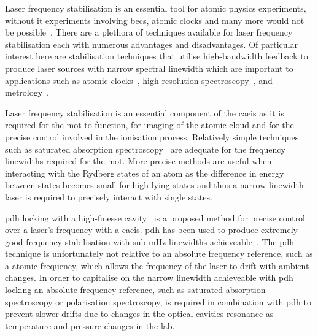 
Laser frequency stabilisation is an essential tool for atomic physics experiments, without it experiments involving \glspl{bec}, atomic clocks and many more would not be possible~\cite{anderson_observation_1995,demarco_onset_1999,uetake_high_2008,ye_stable_2010,akamatsu_narrow_2012}.
There are a plethora of techniques available for laser frequency stabilisation each with numerous advantages and disadvantages.
Of particular interest here are stabilisation techniques that utilise high-bandwidth feedback to produce laser sources with narrow spectral linewidth which are important to applications such as atomic clocks~\cite{ludlow_sr_2008}, high-resolution spectroscopy~\cite{rafac_sub-dekahertz_2000}, and metrology~\cite{metcalf_laser_1999,ye_quantum_2008}.

Laser frequency stabilisation is an essential component of the \gls{caeis} as it is required for the \gls{mot} to function, for imaging of the atomic cloud and for the precise control involved in the ionisation process.
Relatively simple techniques such as saturated absorption spectroscopy~\cite{haroche_theory_1972,preston_doppler-free_1996,maguire_theoretical_2006} are adequate for the frequency linewidths required for the \gls{mot}.
More precise methods are useful when interacting with the Rydberg states of an atom as the difference in energy between states becomes small for high-lying states and thus a narrow linewidth laser is required to precisely interact with single states.

\Gls{pdh} locking with a high-finesse cavity~\cite{drever_laser_1983} is a proposed method for precise control over a laser's frequency with a \gls{caeis}.
\Gls{pdh} has been used to produce extremely good frequency stabilisation with sub-\unit[40]{mHz} linewidths achieveable~\cite{ludlow_compact_2007,kessler_sub-40-mhz-linewidth_2012}.
The \gls{pdh} technique is unfortunately not relative to an absolute frequency reference, such as a atomic frequency, which allows the frequency of the laser to drift with ambient changes.
In order to capitalise on the narrow linewidth achieveable with \gls{pdh} locking an absolute frequency reference, such as saturated absorption spectroscopy or polarisation spectroscopy, is required in combination with \gls{pdh} to prevent slower drifts due to changes in the optical cavities resonance as temperature and pressure changes in the lab.


